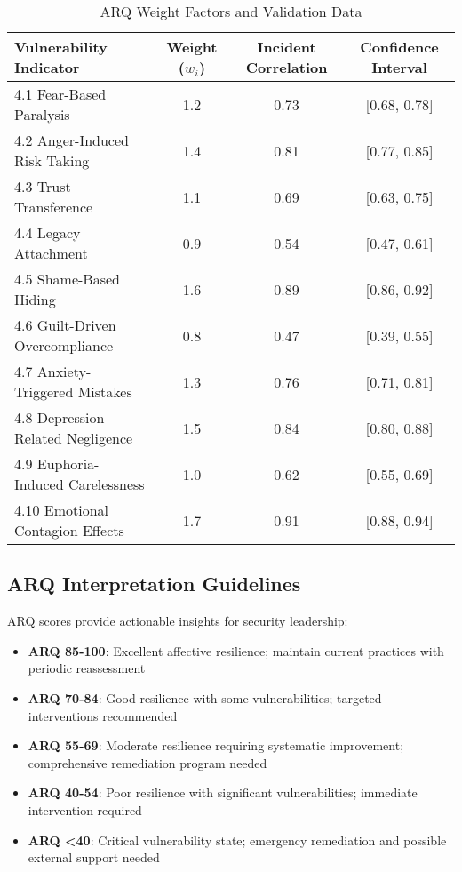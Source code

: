 \documentclass[11pt,a4paper]{article}
\begin{document}
\begin{table}[H]
\centering
\caption{ARQ Weight Factors and Validation Data}
\label{tab:arq_weights}
\begin{tabular}{lccc}
\toprule
Vulnerability Indicator & Weight ($w_i$) & Incident Correlation & Confidence Interval \\
\midrule
4.1 Fear-Based Paralysis & 1.2 & 0.73 & [0.68, 0.78] \\
4.2 Anger-Induced Risk Taking & 1.4 & 0.81 & [0.77, 0.85] \\
4.3 Trust Transference & 1.1 & 0.69 & [0.63, 0.75] \\
4.4 Legacy Attachment & 0.9 & 0.54 & [0.47, 0.61] \\
4.5 Shame-Based Hiding & 1.6 & 0.89 & [0.86, 0.92] \\
4.6 Guilt-Driven Overcompliance & 0.8 & 0.47 & [0.39, 0.55] \\
4.7 Anxiety-Triggered Mistakes & 1.3 & 0.76 & [0.71, 0.81] \\
4.8 Depression-Related Negligence & 1.5 & 0.84 & [0.80, 0.88] \\
4.9 Euphoria-Induced Carelessness & 1.0 & 0.62 & [0.55, 0.69] \\
4.10 Emotional Contagion Effects & 1.7 & 0.91 & [0.88, 0.94] \\
\bottomrule
\end{tabular}
\end{table}

\FloatBarrier

\subsection{ARQ Interpretation Guidelines}

ARQ scores provide actionable insights for security leadership:

\begin{itemize}
\item \textbf{ARQ 85-100}: Excellent affective resilience; maintain current practices with periodic reassessment
\item \textbf{ARQ 70-84}: Good resilience with some vulnerabilities; targeted interventions recommended
\item \textbf{ARQ 55-69}: Moderate resilience requiring systematic improvement; comprehensive remediation program needed
\item \textbf{ARQ 40-54}: Poor resilience with significant vulnerabilities; immediate intervention required
\item \textbf{ARQ <40}: Critical vulnerability state; emergency remediation and possible external support needed
\end{itemize}
\end{document}
